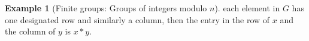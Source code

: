\documentclass[nohyper,nobib]{tufte-handout}
\theoremstyle{definition}
\newtheorem{exmp}[thm]{Example}
\theoremstyle{remark}
\begin{document}
\begin{exmp}[Finite groups: Groups of integers modulo $n$]
\noindent
each element in $G$ has one designated row and similarly a column, then the entry in the row of $x$ and the column of $y$ is $x * y$.


\begin{marginfigure}
    \centering
    \def\svgwidth{\linewidth}
    \resizebox{0.6\textwidth}{!}{}
    \caption{Addition modulo $n$ can be visualized by hoping around equidistant points on an arc of a unit circle.}
\end{marginfigure}

\end{exmp}
\end{document}
